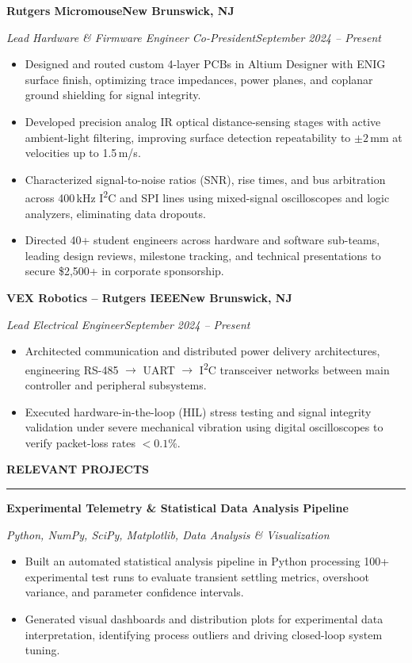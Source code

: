 \documentclass[10pt]{article}
\newcommand{\Section}[1]{%
  \vspace{2.5pt}%
  \textbf{\MakeUppercase{#1}}\par\vspace{-3.5pt}%
  \rule{\linewidth}{0.5pt}\par\vspace{1.2pt}%
}
\newcommand{\Company}[2]{\noindent\textbf{#1}\hfill\textbf{#2}\par}
\newcommand{\RoleDates}[2]{\noindent\textit{#1}\hfill\textit{#2}\par}
\begin{document}
\Company{Rutgers Micromouse}{New Brunswick, NJ}
\RoleDates{Lead Hardware \& Firmware Engineer \textbar{} Co-President}{September 2024 -- Present}
\begin{itemize}
  \item Designed and routed custom 4-layer PCBs in Altium Designer with ENIG surface finish, optimizing trace impedances, power planes, and coplanar ground shielding for signal integrity.
  \item Developed precision analog IR optical distance-sensing stages with active ambient-light filtering, improving surface detection repeatability to $\pm2$\,mm at velocities up to 1.5\,m/s.
  \item Characterized signal-to-noise ratios (SNR), rise times, and bus arbitration across 400\,kHz I\textsuperscript{2}C and SPI lines using mixed-signal oscilloscopes and logic analyzers, eliminating data dropouts.
  \item Directed 40+ student engineers across hardware and software sub-teams, leading design reviews, milestone tracking, and technical presentations to secure \$2,500+ in corporate sponsorship.
\end{itemize}

\Company{VEX Robotics -- Rutgers IEEE}{New Brunswick, NJ}
\RoleDates{Lead Electrical Engineer}{September 2024 -- Present}
\begin{itemize}
  \item Architected communication and distributed power delivery architectures, engineering RS-485 $\rightarrow$ UART $\rightarrow$ I\textsuperscript{2}C transceiver networks between main controller and peripheral subsystems.
  \item Executed hardware-in-the-loop (HIL) stress testing and signal integrity validation under severe mechanical vibration using digital oscilloscopes to verify packet-loss rates $<0.1\%$.
\end{itemize}

\Section{Relevant Projects}

\Company{Experimental Telemetry \& Statistical Data Analysis Pipeline}{}
\RoleDates{Python, NumPy, SciPy, Matplotlib, Data Analysis \& Visualization}{}
\begin{itemize}
  \item Built an automated statistical analysis pipeline in Python processing 100+ experimental test runs to evaluate transient settling metrics, overshoot variance, and parameter confidence intervals.
  \item Generated visual dashboards and distribution plots for experimental data interpretation, identifying process outliers and driving closed-loop system tuning.
\end{itemize}
\end{document}

